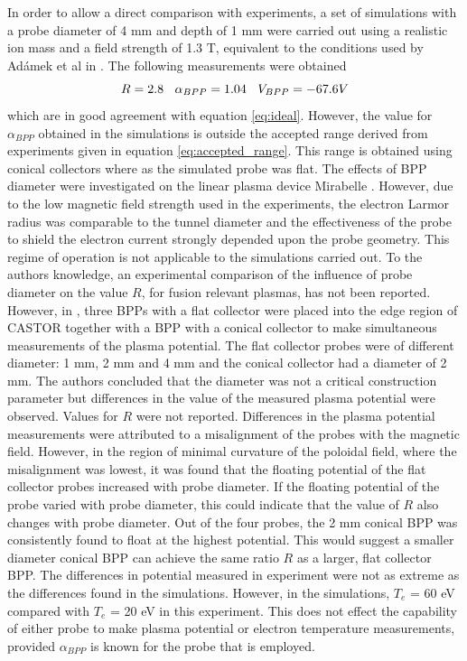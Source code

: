 In order to allow a direct comparison with experiments, a set of simulations with a probe diameter of 4 mm and depth of 1 mm were carried out using a realistic ion mass and a field strength of 1.3 T, equivalent to the conditions used by Ad{\'a}mek et al in \cite{BPP}. The following measurements were obtained
\begin{equation}
R = 2.8 \>\>\>\>   \alpha_{BPP} = 1.04 \>\>\>\>   V_{BPP} = -67.6 \space V 
\end{equation}
which are in good agreement with equation \ref{eq:ideal}. However, the value for $\alpha_{BPP}$ obtained in the simulations is outside the accepted range derived from experiments given in equation \ref{eq:accepted_range}. This range is obtained using conical collectors where as the simulated probe was flat. The effects of BPP diameter were investigated on the linear plasma device Mirabelle \cite{mirabelle}. However, due to the low magnetic field strength used in the experiments, the electron Larmor radius was comparable to the tunnel diameter and the effectiveness of the probe to shield the electron current strongly depended upon the probe geometry. This regime of operation is not applicable to the simulations carried out. To the authors knowledge, an experimental comparison of the influence of probe diameter on the value $R$, for fusion relevant plasmas,  has not been reported.  However, in \cite{bpp_diameter}, three BPPs with a flat collector were placed into the edge region of CASTOR together with a BPP with a conical collector to make simultaneous measurements of the plasma potential. The flat collector probes were of different diameter: 1 mm, 2 mm and 4 mm and the conical collector had a diameter of 2 mm. The authors concluded that the diameter was not a critical construction parameter but differences in the value of the measured plasma potential were observed. Values for $R$ were not reported. Differences in the plasma potential measurements were attributed to a misalignment of the probes with the magnetic field. However, in the region of minimal curvature of the poloidal field, where the misalignment was lowest, it was found that the floating potential of the flat collector probes increased with probe diameter. If the floating potential of the probe varied with probe diameter, this could indicate that the value of $R$ also changes with probe diameter. Out of the four probes, the 2 mm conical BPP was consistently found to float at the highest potential. This would suggest a smaller diameter conical BPP can achieve the same ratio $R$ as a larger, flat collector BPP. The differences in potential measured in experiment were not as extreme as the differences found in the simulations. However, in the simulations, $T_e$ = 60 eV compared with $T_e$ = 20 eV in this experiment. This does not effect the capability of either probe to make plasma potential or electron temperature measurements, provided $\alpha_{BPP}$ is known for the probe that is employed. 

